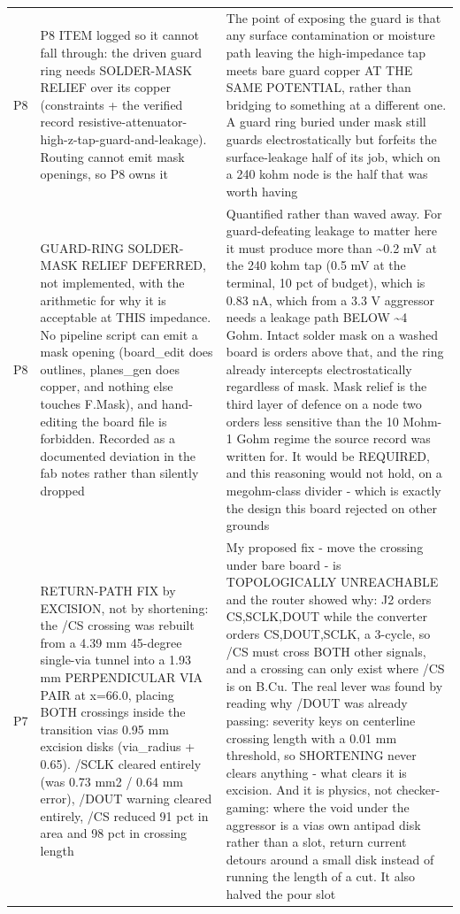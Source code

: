 \documentclass[11pt,a4paper]{article}
\begin{document}
{\begin{longtable}{lp{5.2cm}p{7.2cm}}
P8 & P8 ITEM logged so it cannot fall through: the driven guard ring needs SOLDER-MASK RELIEF over its copper (constraints + the verified record resistive-attenuator-high-z-tap-guard-and-leakage). Routing cannot emit mask openings, so P8 owns it & The point of exposing the guard is that any surface contamination or moisture path leaving the high-impedance tap meets bare guard copper AT THE SAME POTENTIAL, rather than bridging to something at a different one. A guard ring buried under mask still guards electrostatically but forfeits the surface-leakage half of its job, which on a 240 kohm node is the half that was worth having \\
P8 & GUARD-RING SOLDER-MASK RELIEF DEFERRED, not implemented, with the arithmetic for why it is acceptable at THIS impedance. No pipeline script can emit a mask opening (board\_edit does outlines, planes\_gen does copper, and nothing else touches F.Mask), and hand-editing the board file is forbidden. Recorded as a documented deviation in the fab notes rather than silently dropped & Quantified rather than waved away. For guard-defeating leakage to matter here it must produce more than \textasciitilde{}0.2 mV at the 240 kohm tap (0.5 mV at the terminal, 10 pct of budget), which is 0.83 nA, which from a 3.3 V aggressor needs a leakage path BELOW \textasciitilde{}4 Gohm. Intact solder mask on a washed board is orders above that, and the ring already intercepts electrostatically regardless of mask. Mask relief is the third layer of defence on a node two orders less sensitive than the 10 Mohm-1 Gohm regime the source record was written for. It would be REQUIRED, and this reasoning would not hold, on a megohm-class divider - which is exactly the design this board rejected on other grounds \\
P7 & RETURN-PATH FIX by EXCISION, not by shortening: the /CS crossing was rebuilt from a 4.39 mm 45-degree single-via tunnel into a 1.93 mm PERPENDICULAR VIA PAIR at x=66.0, placing BOTH crossings inside the transition vias 0.95 mm excision disks (via\_radius + 0.65). /SCLK cleared entirely (was 0.73 mm2 / 0.64 mm error), /DOUT warning cleared entirely, /CS reduced 91 pct in area and 98 pct in crossing length & My proposed fix - move the crossing under bare board - is TOPOLOGICALLY UNREACHABLE and the router showed why: J2 orders CS,SCLK,DOUT while the converter orders CS,DOUT,SCLK, a 3-cycle, so /CS must cross BOTH other signals, and a crossing can only exist where /CS is on B.Cu. The real lever was found by reading why /DOUT was already passing: severity keys on centerline crossing length with a 0.01 mm threshold, so SHORTENING never clears anything - what clears it is excision. And it is physics, not checker-gaming: where the void under the aggressor is a vias own antipad disk rather than a slot, return current detours around a small disk instead of running the length of a cut. It also halved the pour slot \\

\end{longtable}}
\end{document}
